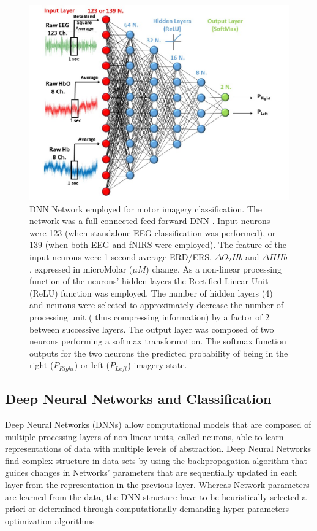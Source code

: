 \documentclass[12pt ]{iopart}
\begin{document}
\begin{figure}
	\includegraphics[width=\linewidth]{Slide3.JPG}
	\caption{DNN Network employed for motor imagery classification. The network was a full connected feed-forward  DNN . Input neurons were 123 (when standalone EEG classification was performed), or 139 (when both EEG and fNIRS were employed). 
	The feature of the input neurons were 1 second average ERD/ERS, $\Delta O_{2}Hb$ and $\Delta HHb$, expressed in microMolar ($\mu M$) change. 
	 As a non-linear processing function of the neurons' hidden layers the Rectified Linear Unit (ReLU) function was employed. 
	 The number of hidden layers (4) and neurons were selected to approximately decrease the number of processing unit ( thus compressing information) by a factor of 2 between successive layers. The output layer was composed of two neurons performing a softmax transformation. The softmax function outputs for the two neurons  the predicted probability of being in the right ($P_{Right}$) or left ($P_{Left}$) imagery state. }
	\label{fig:fig3}
\end{figure}

\subsection{Deep Neural Networks and Classification}
Deep Neural Networks (DNNs) allow computational models that are composed of multiple  processing layers of non-linear units, called neurons, able to learn representations of data with multiple levels of abstraction.
Deep Neural Networks find complex structure in  data-sets by using the backpropagation algorithm \parencite{hecht1988theory} that guides changes in Networks' parameters that are sequentially updated in each layer from the representation in the previous layer.
Whereas Network parameters are learned from the data, the DNN structure have to be heuristically selected a priori or determined through computationally demanding hyper parameters optimization algorithms %
\parencite{mackay1996hyperparameters,snoek2012practical,bengio2000gradient}
\end{document}
